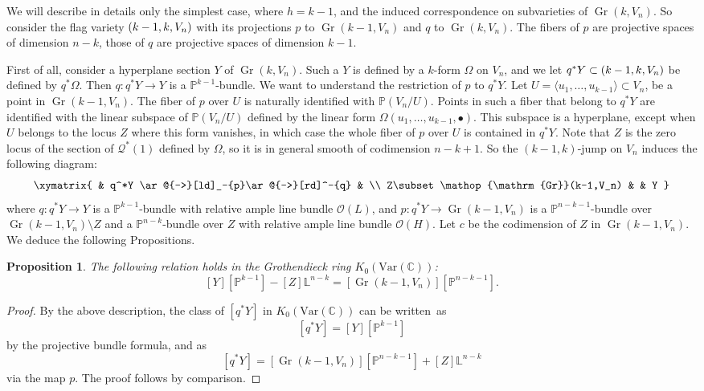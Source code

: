 \documentclass[JEP,XML,SOM,Unicode,NoEqCountersInSection]{cedram}
\newcommand{\NoChangel}[1]{%
\expandafter\let\csname old\string#1\endcsname=#1
\let#1=\relax
\newcommand{#1}{\mathcode`l="716C\csname old\string#1\endcsname\mathcode`l="7160 }%
}
\newcommand{\sbullet}{{\scriptstyle\bullet}}
\newcommand{\Var}{\mathrm{Var}}
\let\mathcal\mathscr
\theoremstyle{plain}
\newtheorem{prop}[theorem]{Proposition}
\theoremstyle{definition}
\DeclareMathOperator{\Gr}{Gr}
\DeclareMathOperator{\Fl}{Fl}\NoChangel{\Fl}
\newcommand{\CC}{\mathbb{C}}
\newcommand{\LL}{\mathbb{L}}
\newcommand{\PP}{\mathbb{P}}
\newcommand{\sheaf}[1]{\mathcal{#1}}
\newcommand{\ko}{\sheaf{O}}\let\OO\ko\let\cO\ko
\newcommand{\kq}{\sheaf{Q}}
\begin{document}
We will describe in details only the simplest case, where $h=k-1$, and the induced correspondence
on subvarieties of $\Gr(k,V_n)$. So consider
the flag variety $\Fl(k-1,k,V_n)$ with its projections $p$ to $\Gr(k-1,V_n)$ and $q$
to $\Gr(k,V_n)$. The fibers of $p$ are projective spaces of dimension $n-k$, those of
$q$ are projective spaces of dimension $k-1$.

First of all, consider a hyperplane section $Y$ of $\Gr(k,V_n)$. Such a $Y$ is defined
by a $k$-form $\Omega$ on $V_n$, and we let $q^* Y \subset \Fl(k-1,k,V_n)$ be defined by $q^*\Omega$.
Then $q : q^* Y \to Y$ is a $\PP^{k-1}$-bundle. We want to understand the restriction of $p$ to $q^*Y$.
Let $U=\langle u_1,\ldots, u_{k-1}\rangle \subset V_n$, be a point in $\Gr(k-1,V_n)$. The fiber of $p$ over $U$ is naturally identified with $\PP(V_n/U)$. Points in such a fiber that belong to $q^*Y$ are identified with the linear subspace of $\PP(V_n/U)$
defined by the linear form $\Omega (u_1,\ldots, u_{k-1}, \sbullet)$. This subspace is a hyperplane,
except when $U$ belongs to the locus $Z$ where this form vanishes, in which case the whole
fiber of $p$ over $U$ is contained in $q^*Y$. Note that $Z$ is the zero locus of the section
of $\kq^*(1)$ defined by $\Omega$, so it is in general smooth of codimension $n-k+1$.
So the $(k-1,k)$-jump on $V_n$ induces the following diagram:
\[
\xymatrix{
& q^*Y \ar@{->}[ld]_-{p}\ar@{->}[rd]^-{q} & \\
Z\subset \Gr(k-1,V_n) & & Y
}
\]
where $q: q^*Y \to Y$ is a $\PP^{k-1}$-bundle with relative ample line bundle $\ko(L)$, and
$p: q^* Y \to \Gr(k-1,V_n)$ is a
$\PP^{n-k-1}$-bundle over $\Gr(k-1,V_n)\setminus Z$ and a $\PP^{n-k}$-bundle
over $Z$ with relative ample line bundle $\ko(H)$. Let $c$ be the codimension of $Z$ in $\Gr(k-1,V_n)$.
We deduce the following Propositions.

\begin{prop}\label{prop:K0-jump}
The following relation holds in the Grothendieck ring $K_0(\Var(\CC))$:%
\begin{equation*}\label{eq:rel-in-K0-jump}
[Y][\PP^{k-1}]-[Z]\LL^{n-k}=[\Gr(k-1,V_n)][\PP^{n-k-1}].
\end{equation*}
\end{prop}

\begin{proof}
By the above description, the class of $[q^*Y]$ in $K_0(\Var(\CC))$ can be written~as%
\begin{equation}\label{eq:jumping-diagram-Hsection}
[q^*Y]=[Y][\PP^{k-1}]
\end{equation}
by the projective bundle formula, and as
\[
[q^*Y]=[\Gr(k-1,V_n)][\PP^{n-k-1}] + [Z]\LL^{n-k}
\]
via the map $p$. The proof follows by comparison.
\end{proof}
\end{document}
